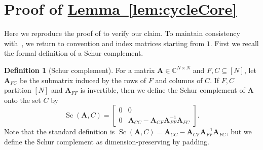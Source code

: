 \documentclass[11pt]{article}
\numberwithin{equation}{section}
\theoremstyle{definition}
\newtheorem{definition}[theorem]{Definition}
\theoremstyle{plain}
\newcommand{\C}{\mathbb C}
\newcommand{\expref}[2]{\hyperref[#2]{#1~\ref{#2}}}
\newcommand{\mA}{\mathbf{A}}
\DeclareMathOperator{\Sc}{Sc}
\begin{document}
\section{Proof of \expref{Lemma}{lem:cycleCore}}\label{sec:app}
Here we reproduce the proof of
%
\cite[Lemma 6.7]{AhmadinejadKeMuPeSiVa19} %
to verify our claim. To maintain consistency with~\cite{AhmadinejadKeMuPeSiVa19}, we return to convention and index matrices starting from $1$.
%
First we  %
recall the formal definition of a Schur complement.

\begin{definition}[Schur complement] %
  For a matrix $\mA\in \C^{N\times N}$ and $F,C\subseteq[N]$, let $\mA_{FC}$ be the submatrix induced by the rows of $F$ and columns of $C$. If $F,C$ partition $[N]$ and $\mA_{FF}$ is invertible, then we
%
define  %
the Schur complement of $\mA$ onto the set $C$ by %
%
%
%
%
\[\Sc(\mA,C) = \begin{bmatrix}
0 & 0\\
0 & \mA_{CC}-\mA_{CF}\mA_{FF}^{-1}\mA_{FC}
\end{bmatrix}.\]
Note that the standard definition is $\Sc(\mA,C)=\mA_{CC}-\mA_{CF}\mA_{FF}^{-1}\mA_{FC}$, but we define the Schur complement as dimension-preserving by padding.
%
\end{definition}
\end{document}
